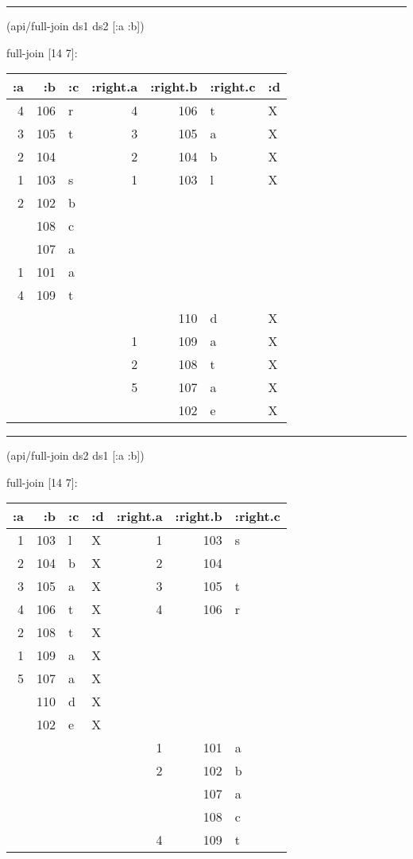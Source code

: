 \documentclass[]{article}
\newenvironment{Shaded}{\begin{snugshade}}{\end{snugshade}}
\newcommand{\AttributeTok}[1]{\textcolor[rgb]{0.77,0.63,0.00}{#1}}
\newcommand{\NormalTok}[1]{#1}
\begin{document}
\begin{center}\rule{0.5\linewidth}{0.5pt}\end{center}

\begin{Shaded}
\begin{Highlighting}[]
\NormalTok{(api/full-join ds1 ds2 [}\AttributeTok{:a} \AttributeTok{:b}\NormalTok{])}
\end{Highlighting}
\end{Shaded}

full-join {[}14 7{]}:

\begin{longtable}[]{@{}rrlrrll@{}}
\toprule
:a & :b & :c & :right.a & :right.b & :right.c & :d\tabularnewline
\midrule
\endhead
4 & 106 & r & 4 & 106 & t & X\tabularnewline
3 & 105 & t & 3 & 105 & a & X\tabularnewline
2 & 104 & & 2 & 104 & b & X\tabularnewline
1 & 103 & s & 1 & 103 & l & X\tabularnewline
2 & 102 & b & & & &\tabularnewline
& 108 & c & & & &\tabularnewline
& 107 & a & & & &\tabularnewline
1 & 101 & a & & & &\tabularnewline
4 & 109 & t & & & &\tabularnewline
& & & & 110 & d & X\tabularnewline
& & & 1 & 109 & a & X\tabularnewline
& & & 2 & 108 & t & X\tabularnewline
& & & 5 & 107 & a & X\tabularnewline
& & & & 102 & e & X\tabularnewline
\bottomrule
\end{longtable}

\begin{center}\rule{0.5\linewidth}{0.5pt}\end{center}

\begin{Shaded}
\begin{Highlighting}[]
\NormalTok{(api/full-join ds2 ds1 [}\AttributeTok{:a} \AttributeTok{:b}\NormalTok{])}
\end{Highlighting}
\end{Shaded}

full-join {[}14 7{]}:

\begin{longtable}[]{@{}rrllrrl@{}}
\toprule
:a & :b & :c & :d & :right.a & :right.b & :right.c\tabularnewline
\midrule
\endhead
1 & 103 & l & X & 1 & 103 & s\tabularnewline
2 & 104 & b & X & 2 & 104 &\tabularnewline
3 & 105 & a & X & 3 & 105 & t\tabularnewline
4 & 106 & t & X & 4 & 106 & r\tabularnewline
2 & 108 & t & X & & &\tabularnewline
1 & 109 & a & X & & &\tabularnewline
5 & 107 & a & X & & &\tabularnewline
& 110 & d & X & & &\tabularnewline
& 102 & e & X & & &\tabularnewline
& & & & 1 & 101 & a\tabularnewline
& & & & 2 & 102 & b\tabularnewline
& & & & & 107 & a\tabularnewline
& & & & & 108 & c\tabularnewline
& & & & 4 & 109 & t\tabularnewline
\bottomrule
\end{longtable}
\end{document}
